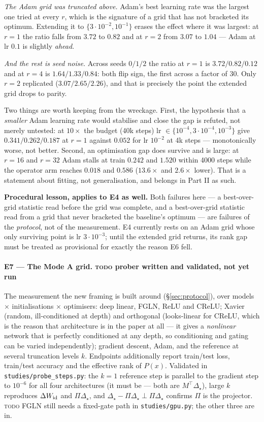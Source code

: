 \documentclass{article}
\newcommand{\TD}{{\color{orange!85!black}\textsc{todo}}}
\newcommand{\NOTE}[1]{{\color{gray}\small #1}}
\theoremstyle{plain}\newtheorem{theorem}{Theorem}\newtheorem{lemma}[theorem]{Lemma}
\theoremstyle{definition}\newtheorem{definition}[theorem]{Definition}
\newcommand{\Dstar}{\Delta_\star}\newcommand{\Lam}{\Lambda}
\begin{document}
\emph{The Adam grid was truncated above.} Adam's best learning rate was the largest one tried at
every $r$, which is the signature of a grid that has not bracketed its optimum. Extending it to
$\{3\cdot10^{-2},10^{-1}\}$ erases the effect where it was largest: at $r{=}1$ the ratio falls from
$3.72$ to $0.82$ and at $r{=}2$ from $3.07$ to $1.04$ --- Adam at lr $0.1$ is slightly \emph{ahead}.

\emph{And the rest is seed noise.} Across seeds $0/1/2$ the ratio at $r{=}1$ is $3.72/0.82/0.12$
and at $r{=}4$ is $1.64/1.33/0.84$: both flip sign, the first across a factor of $30$. Only
$r{=}2$ replicated ($3.07/2.65/2.26$), and that is precisely the point the extended grid drops to
parity.

\NOTE{Two things are worth keeping from the wreckage. First, the hypothesis that a \emph{smaller}
Adam learning rate would stabilise and close the gap is refuted, not merely untested: at $10\times$
the budget (40k steps) lr $\in\{10^{-4},3\cdot10^{-4},10^{-3}\}$ give $0.341/0.262/0.187$ at
$r{=}1$ against $0.052$ for lr $10^{-2}$ at 4k steps --- monotonically worse, not better. Second,
an optimisation gap does survive and is large: at $r{=}16$ and $r{=}32$ Adam stalls at train
$0.242$ and $1.520$ within 4000 steps while the operator arm reaches $0.018$ and $0.586$
($13.6\times$ and $2.6\times$ lower). That is a statement about fitting, not generalisation, and
belongs in Part II as such.}

\NOTE{\textbf{Procedural lesson, applies to E4 as well.} Both failures here --- a best-over-grid
statistic read before the grid was complete, and a best-over-grid statistic read from a grid that
never bracketed the baseline's optimum --- are failures of the \emph{protocol}, not of the
measurement. E4 currently rests on an Adam grid whose only surviving point is lr $3\cdot10^{-3}$;
until the extended grid returns, its rank gap must be treated as provisional for exactly the reason
E6 fell.}

\paragraph{E7 --- The Mode A grid. \TD{} prober written and validated, not yet run}
The measurement the new framing is built around (\S\ref{sec:protocol}), over
models $\times$ initialisations $\times$ optimisers: deep linear, FGLN, ReLU and CReLU;
Xavier (random, ill-conditioned at depth) and orthogonal (looks-linear for CReLU, which is the
reason that architecture is in the paper at all --- it gives a \emph{nonlinear} network that is
perfectly conditioned at any depth, so conditioning and gating can be varied independently);
gradient descent, Adam, and the reference at several truncation levels $k$. Endpoints additionally
report train/test loss, train/test accuracy and the effective rank of $P(x)$.
\NOTE{Validated in \texttt{studies/probe\_steps.py}: the $k{=}1$ reference step is parallel to the
gradient step to $10^{-6}$ for all four architectures (it must be --- both are $M^\top\Dstar$),
large $k$ reproduces $\Delta W_{\mathrm{id}}$ and $\Pi\Dstar$, and $\Dstar-\Pi\Dstar\perp\Pi\Dstar$
confirms $\Pi$ is the projector. \TD{} FGLN still needs a fixed-gate path in
\texttt{studies/gpu.py}; the other three are in.}
\end{document}
